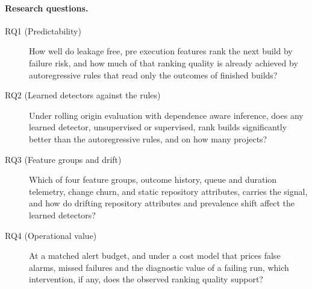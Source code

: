 \documentclass[sigconf,review,anonymous,nonacm]{acmart}
\begin{document}
\paragraph{Research questions.}
\begin{description}
  \item[RQ1 (Predictability)] How well do leakage free, pre execution features rank the next build by failure risk, and how much of that ranking quality is already achieved by autoregressive rules that read only the outcomes of finished builds?
  \item[RQ2 (Learned detectors against the rules)] Under rolling origin evaluation with dependence aware inference, does any learned detector, unsupervised or supervised, rank builds significantly better than the autoregressive rules, and on how many projects?
  \item[RQ3 (Feature groups and drift)] Which of four feature groups, outcome history, queue and duration telemetry, change churn, and static repository attributes, carries the signal, and how do drifting repository attributes and prevalence shift affect the learned detectors?
  \item[RQ4 (Operational value)] At a matched alert budget, and under a cost model that prices false alarms, missed failures and the diagnostic value of a failing run, which intervention, if any, does the observed ranking quality support?
\end{description}
\end{document}
